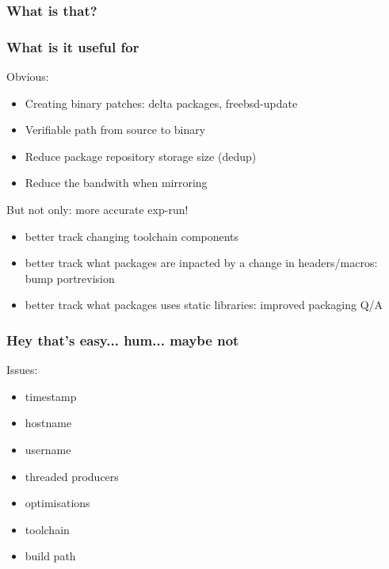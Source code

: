 \begin{frame}
	\frametitle{What is that?}
\end{frame}

\begin{frame}
	\frametitle{What is it useful for}
	Obvious:
	\begin{itemize}
		\item Creating binary patches: delta packages, freebsd-update
		\item Verifiable path from source to binary
		\item Reduce package repository storage size (dedup)
		\item Reduce the bandwith when mirroring
	\end{itemize}
	\pause
	But not only: more accurate exp-run!
	\begin{itemize}
		\item better track changing toolchain components
		\item better track what packages are inpacted by a change in headers/macros: bump portrevision
		\item better track what packages uses static libraries: improved packaging Q/A
	\end{itemize}
\end{frame}

\begin{frame}
	\frametitle{Hey that's easy... hum... maybe not}
	Issues:
	\begin{itemize}
		\item timestamp
		\pause
		\item hostname
		\pause
		\item username
		\pause
		\item threaded producers
		\pause
		\item optimisations
		\pause
		\item toolchain
		\pause
		\item build path
	\end{itemize}
\end{frame}

